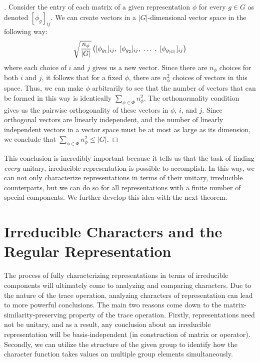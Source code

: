 \documentclass[10pt]{ucthesis}
\begin{document}
\begin{proof}[\cite{Tung}] Consider the entry of each matrix of a given representation $\phi$ for every $g \in G$ as denoted $[\phi_g]_{ij}$. We can create vectors in a $|G|$-dimensional vector space in the following way:
$$\sqrt{\frac{n_\phi}{|G|}}\left([\phi_{g_1}]_{ij},\hspace{1mm} [\phi_{g_2}]_{ij}, \hspace{1mm}\hdots \hspace{1mm},\hspace{1mm} [\phi_{g_{|G|}}]_{ij}\right)$$
where each choice of $i$ and $j$ gives us a new vector. Since there are $n_\phi$ choices for both $i$ and $j$, it follows that for a fixed $\phi$, there are $n_\phi^2$ choices of vectors in this space. Thus, we can make $\phi$ arbitrarily to see that the number of vectors that can be formed in this way is identically $\sum_{\phi \in \Phi}n^2_\phi$. The orthonormality condition gives us the pairwise orthogonality of these vectors in $\phi$, $i$, and $j$. Since orthogonal vectors are linearly independent, and the number of linearly independent vectors in a vector space must be at most as large as its dimension, we conclude that $\sum_{\phi \in \Phi}n^2_\phi \leq |G|$.  \end{proof}


This conclusion is incredibly important because it tells us that the task of finding \textit{every} unitary, irreducible representation is possible to accomplish. In this way, we can not only characterize representations in terms of their unitary, irreducible counterparts, but we can do so for all representations with a finite number of special components. We further develop this idea with the next theorem.


\section{Irreducible Characters and the Regular Representation}

The process of fully characterizing representations in terms of irreducible components will ultimately come to analyzing and comparing characters. Due to the nature of the trace operation, analyzing characters of representation can lead to more powerful conclusions. The main two reasons come down to the matrix-similarity-preserving property of the trace operation. Firstly, representations need not be unitary, and as a result, any conclusion about an irreducible representation will be basis-independent (in construction of matrix or operator). Secondly, we can utilize the structure of the given group to identify how the character function takes values on multiple group elements simultaneously. 
\end{document}
